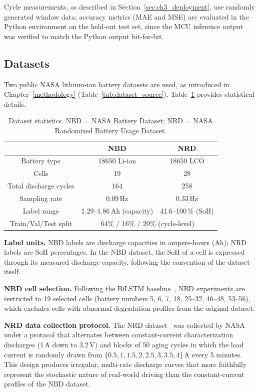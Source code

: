 Cycle measurements, as described in Section~\ref{sec:ch3_deployment}, use randomly generated window data; accuracy metrics (MAE and MSE) are evaluated in the Python environment on the held-out test set, since the MCU inference output was verified to match the Python output bit-for-bit.

\subsection{Datasets}

Two public NASA lithium-ion battery datasets are used, as introduced in Chapter~\ref{methodology} (Table~\ref{tab:dataset_source}). Table~\ref{tab:dataset_stats} provides statistical details.

\begin{table}[H]
    \centering
    \setcellgapes{3pt}
    \makegapedcells
    \begin{tabular}{c c c}
    \hline
    & NBD & NRD \\
    \hline
    Battery type & 18650 Li-ion & 18650 LCO \\
    Cells & 19 & 28 \\
    Total discharge cycles & 164 & 258 \\
    Sampling rate & 0.09\,Hz & 0.33\,Hz \\
    Label range & 1.29--1.86\,Ah (capacity) & 41.6--100\,\% (SoH) \\
    Train/Val/Test split & \multicolumn{2}{c}{64\% / 16\% / 20\% (cycle-level)} \\
    \hline
    \end{tabular}
    \caption{Dataset statistics. NBD = NASA Battery Dataset; NRD = NASA Randomized Battery Usage Dataset.}
    \label{tab:dataset_stats}
\end{table}

\textbf{Label units.} NBD labels are discharge capacities in ampere-hours (Ah); NRD labels are SoH percentages. In the NBD dataset, the SoH of a cell is expressed through its measured discharge capacity, following the convention of the dataset itself.

\textbf{NBD cell selection.} Following the BiLSTM baseline~\autocite{Sammartino2021}, NBD experiments are restricted to 19 selected cells (battery numbers 5, 6, 7, 18, 25--32, 46--48, 53--56), which excludes cells with abnormal degradation profiles from the original dataset.

\textbf{NRD data collection protocol.} The NRD dataset~\autocite{nasa_data_randomized} was collected by NASA under a protocol that alternates between constant-current characterization discharges (1\,A down to 3.2\,V) and blocks of 50 aging cycles in which the load current is randomly drawn from $\{0.5, 1, 1.5, 2, 2.5, 3, 3.5, 4\}$\,A every 5 minutes. This design produces irregular, multi-rate discharge curves that more faithfully represent the stochastic nature of real-world driving than the constant-current profiles of the NBD dataset.

